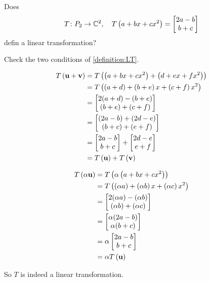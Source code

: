\documentclass{ximera}
\begin{document}
\begin{question}
Does
\[
T\colon P_2\rightarrow\mathbb{C}^{2},\quad T\left(a+bx+cx^2\right)=\begin{bmatrix}2a-b\\b+c\end{bmatrix}
\]
defin a linear transformation?

\begin{hint}Check the two conditions of \ref{definition:LT}.\end{hint}
\begin{hint}
\begin{align*}
T\left(\mathbf{u}+\mathbf{v}\right)
&=T\left(\left(a+bx+cx^2\right)+\left(d+ex+fx^2\right)\right)\\
&=T\left(\left(a+d\right)+\left(b+e\right)x+\left(c+f\right)x^2\right)\\
&=\begin{bmatrix}2(a+d)-(b+e)\\(b+e)+(c+f)\end{bmatrix}\\
&=\begin{bmatrix}(2a-b)+(2d-e)\\(b+c)+(e+f)\end{bmatrix}\\
&=\begin{bmatrix}2a-b\\b+c\end{bmatrix}+\begin{bmatrix}2d-e\\e+f\end{bmatrix}\\
&=T\left(\mathbf{u}\right)+T\left(\mathbf{v}\right)
\end{align*}
\end{hint}
\begin{hint}
\begin{align*}
T\left(\alpha\mathbf{u}\right)
&=T\left(\alpha\left(a+bx+cx^2\right)\right)\\
&=T\left(\left(\alpha a\right)+\left(\alpha b\right)x+\left(\alpha c\right)x^2\right)\\
&=\begin{bmatrix}2(\alpha a)-(\alpha b)\\(\alpha b)+(\alpha c)\end{bmatrix}\\
&=\begin{bmatrix}\alpha(2a-b)\\\alpha(b+c)\end{bmatrix}\\
&=\alpha\begin{bmatrix}2a-b\\b+c\end{bmatrix}\\
&=\alpha T\left(\mathbf{u}\right)
\end{align*}
\end{hint}
\begin{hint}
So $T$ is indeed a linear transformation.
\end{hint}

\begin{multipleChoice}
\end{multipleChoice}
\end{question}
\end{document}
